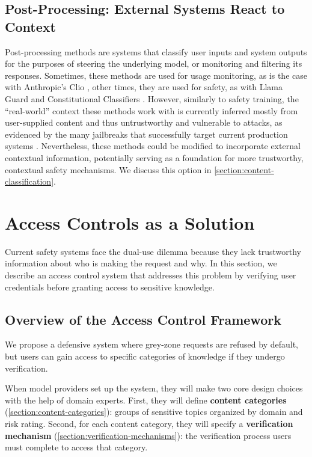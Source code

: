 \documentclass{article}
\theoremstyle{plain}
\theoremstyle{definition}
\theoremstyle{remark}
\begin{document}
\subsection{Post-Processing: External Systems React to Context} \label{section:post-processing}

Post-processing methods are systems that classify user inputs and system outputs for the purposes of steering the underlying model, or monitoring and filtering its responses.
Sometimes, these methods are used for usage monitoring, as is the case with Anthropic's Clio \cite{tamkin2024clioprivacypreservinginsightsrealworld, handa2025economictasksperformedai}, other times, they are used for safety, as with Llama Guard \cite{inan2023llamaguardllmbasedinputoutput} and Constitutional Classifiers \cite{sharma2025constitutionalclassifiersdefendinguniversal}.
However, similarly to safety training, the ``real-world'' context these methods work with is currently inferred mostly from user-supplied content and thus untrustworthy and vulnerable to attacks, as evidenced by the many jailbreaks that successfully target current production systems \cite{zhang2025outputconstraintsattacksurface}.
Nevertheless, these methods could be modified to incorporate external contextual information, potentially serving as a foundation for more trustworthy, contextual safety mechanisms. We discuss this option in \cref{section:content-classification}.

\section{Access Controls as a Solution}
\label{section:access-controls}

Current safety systems face the dual-use dilemma because they lack trustworthy information about who is making the request and why.
In this section, we describe an access control system that addresses this problem by verifying user credentials before granting access to sensitive knowledge.

\subsection{Overview of the Access Control Framework} \label{section:access-control-overview}

We propose a defensive system where grey-zone requests are refused by default, but users can gain access to specific categories of knowledge if they undergo verification.

When model providers set up the system, they will make two core design choices with the help of domain experts.
First, they will define \textbf{content categories} (\cref{section:content-categories}): groups of sensitive topics organized by domain and risk rating.
Second, for each content category, they will specify a \textbf{verification mechanism} (\cref{section:verification-mechanisms}): the verification process users must complete to access that category.
\end{document}
